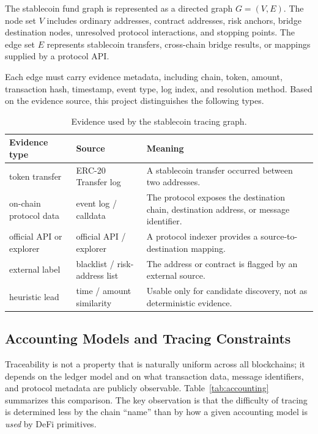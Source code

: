 \documentclass[12pt,a4paper]{article}
\begin{document}
The stablecoin fund graph is represented as a directed graph $G = (V, E)$. The node set $V$ includes ordinary addresses, contract addresses, risk anchors, bridge destination nodes, unresolved protocol interactions, and stopping points. The edge set $E$ represents stablecoin transfers, cross-chain bridge results, or mappings supplied by a protocol API.

Each edge must carry evidence metadata, including chain, token, amount, transaction hash, timestamp, event type, log index, and resolution method. Based on the evidence source, this project distinguishes the following types.

\begin{table}[htbp]
\centering
\caption{Evidence used by the stablecoin tracing graph.}
\label{tab:evidence_types}
\small
\begin{tabularx}{\textwidth}{l l Y}
\toprule
\textbf{Evidence type} & \textbf{Source} & \textbf{Meaning} \\
\midrule
token transfer & ERC-20 Transfer log & A stablecoin transfer occurred between two addresses. \\
on-chain protocol data & event log / calldata & The protocol exposes the destination chain, destination address, or message identifier. \\
official API or explorer & official API / explorer & A protocol indexer provides a source-to-destination mapping. \\
external label & blacklist / risk-address list & The address or contract is flagged by an external source. \\
heuristic lead & time / amount similarity & Usable only for candidate discovery, not as deterministic evidence. \\
\bottomrule
\end{tabularx}
\end{table}

\subsection{Accounting Models and Tracing Constraints}
\label{sec:accounting}

Traceability is not a property that is naturally uniform across all blockchains; it depends on the ledger model and on what transaction data, message identifiers, and protocol metadata are publicly observable. Table~\ref{tab:accounting} summarizes this comparison. The key observation is that the difficulty of tracing is determined less by the chain ``name'' than by how a given accounting model is \emph{used} by DeFi primitives.
\end{document}
